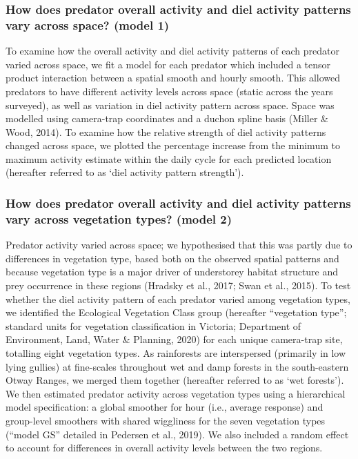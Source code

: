 \documentclass[]{elsarticle} %
\begin{document}
\hypertarget{how-does-predator-overall-activity-and-diel-activity-patterns-vary-across-space-model-1}{%
\subsubsection{How does predator overall activity and diel activity patterns vary across space? (model 1)}\label{how-does-predator-overall-activity-and-diel-activity-patterns-vary-across-space-model-1}}

To examine how the overall activity and diel activity patterns of each predator varied across space, we fit a model for each predator which included a tensor product interaction between a spatial smooth and hourly smooth. This allowed predators to have different activity levels across space (static across the years surveyed), as well as variation in diel activity pattern across space. Space was modelled using camera-trap coordinates and a duchon spline basis (Miller \& Wood, 2014). To examine how the relative strength of diel activity patterns changed across space, we plotted the percentage increase from the minimum to maximum activity estimate within the daily cycle for each predicted location (hereafter referred to as `diel activity pattern strength').

\hypertarget{how-does-predator-overall-activity-and-diel-activity-patterns-vary-across-vegetation-types-model-2}{%
\subsubsection{How does predator overall activity and diel activity patterns vary across vegetation types? (model 2)}\label{how-does-predator-overall-activity-and-diel-activity-patterns-vary-across-vegetation-types-model-2}}

Predator activity varied across space; we hypothesised that this was partly due to differences in vegetation type, based both on the observed spatial patterns and because vegetation type is a major driver of understorey habitat structure and prey occurrence in these regions (Hradsky et al., 2017; Swan et al., 2015). To test whether the diel activity pattern of each predator varied among vegetation types, we identified the Ecological Vegetation Class group (hereafter ``vegetation type''; standard units for vegetation classification in Victoria; Department of Environment, Land, Water \& Planning, 2020) for each unique camera-trap site, totalling eight vegetation types. As rainforests are interspersed (primarily in low lying gullies) at fine-scales throughout wet and damp forests in the south-eastern Otway Ranges, we merged them together (hereafter referred to as `wet forests'). We then estimated predator activity across vegetation types using a hierarchical model specification: a global smoother for hour (i.e., average response) and group-level smoothers with shared wiggliness for the seven vegetation types (``model GS'' detailed in Pedersen et al., 2019). We also included a random effect to account for differences in overall activity levels between the two regions.
\end{document}
